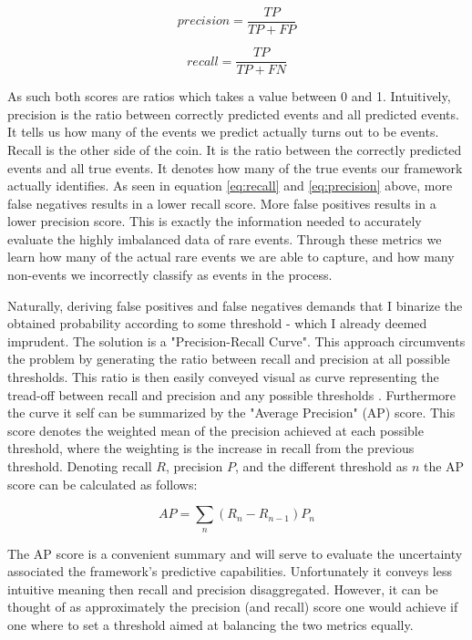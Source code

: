 \documentclass[a4paper]{article}
\begin{document}
\[
precision = \frac{TP}{TP+FP} \tag{2} \label{eq:recall}
\]

\[
recall = \frac{TP}{TP+FN} \tag{3} \label{eq:precision}
\]

As such both scores are ratios which takes a value between 0 and 1. Intuitively, precision is the ratio between correctly predicted events and all predicted events. It tells us how many of the events we predict actually turns out to be events. Recall is the other side of the coin. It is the ratio between the correctly predicted events and all true events. It denotes how many of the true events our framework actually identifies. As seen in equation \ref{eq:recall} and \ref{eq:precision} above, more false negatives results in a lower recall score. More false positives results in a lower precision score. This is exactly the information needed to accurately evaluate the highly imbalanced data of rare events. Through these metrics we learn how many of the actual rare events we are able to capture, and how many non-events we incorrectly classify as events in the process.\par 

Naturally, deriving false positives and false negatives demands that I binarize the obtained probability according to some threshold - which I already deemed imprudent. The solution is a "Precision-Recall Curve". This approach circumvents the problem by generating the ratio between recall and precision at all possible thresholds. This ratio is then easily conveyed visual as curve representing the tread-off between recall and precision and any possible thresholds \cite[1278]{He_2008}. Furthermore the curve it self can be summarized by the "Average Precision" (AP) score. This score denotes the weighted mean of the precision achieved at each possible threshold, where the weighting is the increase in recall from the previous threshold. Denoting recall $R$, precision $P$, and the different threshold as $n$ the AP score can be calculated as follows:\par

\[
AP = \sum_n (R_n-R_{n-1})P_n \tag{4} \label{eq:ap}
\]

The AP score is a convenient summary and will serve to evaluate the uncertainty associated the framework's predictive capabilities. Unfortunately it conveys less intuitive meaning then recall and precision disaggregated. However, it can be thought of as approximately the precision (and recall) score one would achieve if one where to set a threshold aimed at balancing the two metrics equally.\par
\end{document}
